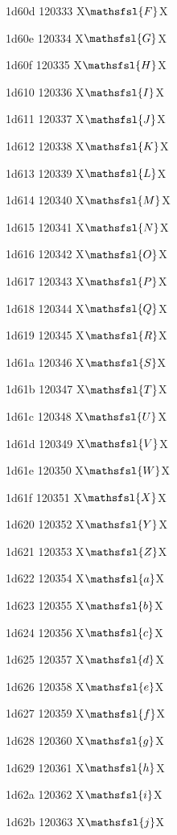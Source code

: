 \documentclass[11pt]{article}
\begin{document}
1d60d 120333 X{\ensuremath{\mathsfsl{F}}}X

1d60e 120334 X{\ensuremath{\mathsfsl{G}}}X

1d60f 120335 X{\ensuremath{\mathsfsl{H}}}X

1d610 120336 X{\ensuremath{\mathsfsl{I}}}X

1d611 120337 X{\ensuremath{\mathsfsl{J}}}X

1d612 120338 X{\ensuremath{\mathsfsl{K}}}X

1d613 120339 X{\ensuremath{\mathsfsl{L}}}X

1d614 120340 X{\ensuremath{\mathsfsl{M}}}X

1d615 120341 X{\ensuremath{\mathsfsl{N}}}X

1d616 120342 X{\ensuremath{\mathsfsl{O}}}X

1d617 120343 X{\ensuremath{\mathsfsl{P}}}X

1d618 120344 X{\ensuremath{\mathsfsl{Q}}}X

1d619 120345 X{\ensuremath{\mathsfsl{R}}}X

1d61a 120346 X{\ensuremath{\mathsfsl{S}}}X

1d61b 120347 X{\ensuremath{\mathsfsl{T}}}X

1d61c 120348 X{\ensuremath{\mathsfsl{U}}}X

1d61d 120349 X{\ensuremath{\mathsfsl{V}}}X

1d61e 120350 X{\ensuremath{\mathsfsl{W}}}X

1d61f 120351 X{\ensuremath{\mathsfsl{X}}}X

1d620 120352 X{\ensuremath{\mathsfsl{Y}}}X

1d621 120353 X{\ensuremath{\mathsfsl{Z}}}X

1d622 120354 X{\ensuremath{\mathsfsl{a}}}X

1d623 120355 X{\ensuremath{\mathsfsl{b}}}X

1d624 120356 X{\ensuremath{\mathsfsl{c}}}X

1d625 120357 X{\ensuremath{\mathsfsl{d}}}X

1d626 120358 X{\ensuremath{\mathsfsl{e}}}X

1d627 120359 X{\ensuremath{\mathsfsl{f}}}X

1d628 120360 X{\ensuremath{\mathsfsl{g}}}X

1d629 120361 X{\ensuremath{\mathsfsl{h}}}X

1d62a 120362 X{\ensuremath{\mathsfsl{i}}}X

1d62b 120363 X{\ensuremath{\mathsfsl{j}}}X
\end{document}
